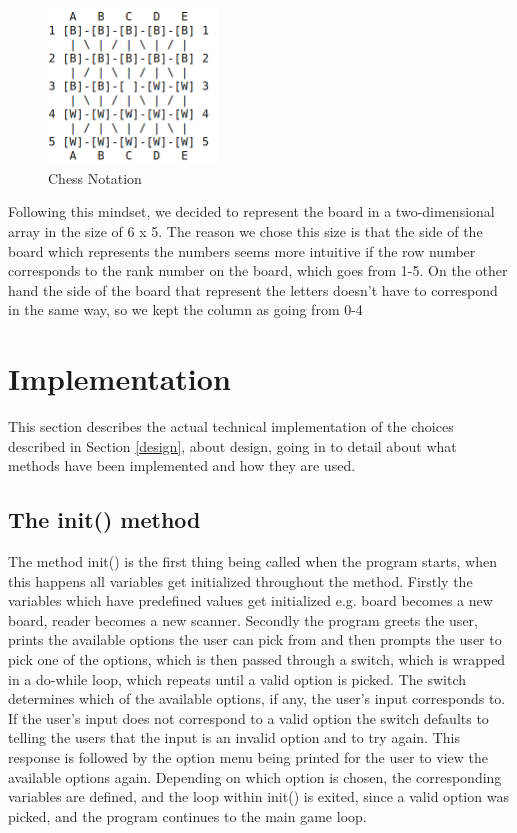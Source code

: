 \documentclass[12pt, a4paper]{article}
\begin{document}
\begin{figure}[h]
    \centering
    \caption{Chess Notation}
    \includegraphics[width=0.4\textwidth]{chessnotation}		
\end{figure}

\vspace{10mm}

Following this mindset, we decided to represent the board in a two-dimensional array in the size of 6 x 5. The reason we chose this size is that the side of the board which represents the numbers seems more intuitive if the row number corresponds to the rank number on the board, which goes from 1-5. On the other hand the side of the board that represent the letters doesn’t have to correspond in the same way, so we kept the column as going from 0-4

\newpage

\section{Implementation}
This section describes the actual technical implementation of the choices described in Section \ref{design}, about design, going in to detail about what methods have been implemented and how they are used.

\subsection{The init() method}

The method init() is the first thing being called when the program starts, when this happens all variables get initialized throughout the method. Firstly the variables which have predefined values get initialized e.g. board becomes a new board, reader becomes a new scanner. Secondly the program greets the user, prints the available options the user can pick from and then prompts the user to pick one of the options, which is then passed through a switch, which is wrapped in a do-while loop, which repeats until a valid option is picked. The switch determines which of the available options, if any, the user's input corresponds to. If the user’s input does not correspond to a valid option the switch defaults to telling the users that the input is an invalid option and to try again. This response is followed by the option menu being printed for the user to view the available options again.
Depending on which option is chosen, the corresponding variables are defined, and the loop within init() is exited, since a valid option was picked, and the program continues to the main game loop.
\end{document}
